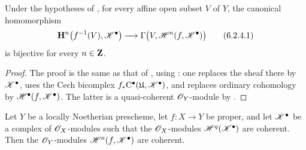 \begin{corollary}[6.2.4]
\label{III.6.2.4}
Under the hypotheses of , for every affine open
subset $V$ of $Y$, the canonical homomorphism
\[
  \mathbf{H}^n\bigl(f^{-1}(V),\sh{K}^\bullet\bigr)
  \longrightarrow
  \Gamma\bigl(V,\mathcal{H}^n(f,\sh{K}^\bullet)\bigr)
  \tag{6.2.4.1}\label{III.6.2.4.1}
\]
is bijective for every $n\in\mathbf{Z}$.
\end{corollary}

\begin{proof}
The proof is the same as that of , using
: one replaces the sheaf there by
$\mathscr{K}^\bullet$, uses the Cech bicomplex
$f_*\mathrm{C}^\bullet(\mathfrak{U},\mathscr{K}^\bullet)$, and replaces
ordinary cohomology by
$\mathscr{H}^\bullet(f,\mathscr{K}^\bullet)$.  The latter is a
quasi-coherent $\mathscr{O}_Y$-module by .
\end{proof}

\begin{proposition}[6.2.5]
\label{III.6.2.5}
Let $Y$ be a locally Noetherian prescheme, let $f:X\to Y$ be
proper, and let $\mathscr{K}^\bullet$ be a complex of
$\mathscr{O}_X$-modules such that the $\mathscr{O}_X$-modules
$\mathscr{H}^q(\mathscr{K}^\bullet)$ are coherent.  Then the
$\mathscr{O}_Y$-modules $\mathscr{H}^n(f,\mathscr{K}^\bullet)$ are
coherent.
\end{proposition}

